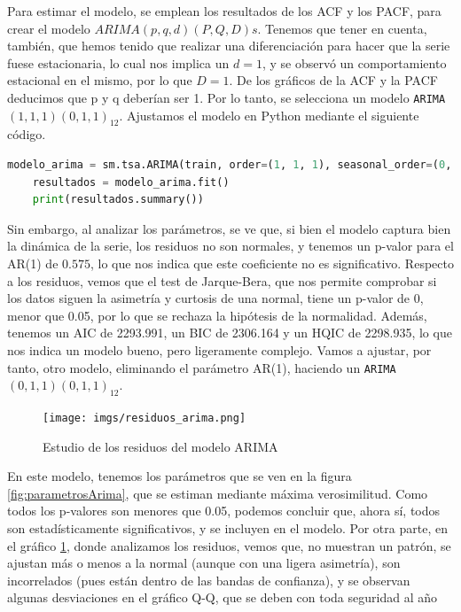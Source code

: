\documentclass[a4paper,onecolumn]{extarticle}
\begin{document}
\begin{sloppypar}
Para estimar el modelo, se emplean los resultados de los ACF y los PACF, para crear el modelo $ARIMA(p,q,d)(P,Q,D)s$. Tenemos que tener en cuenta, también, que 
hemos tenido que realizar una diferenciación para hacer que la serie fuese estacionaria, lo cual nos implica un $d=1$, y se observó un comportamiento estacional 
en el mismo, por lo que $D=1$. De los gráficos de la ACF y la PACF deducimos que p y q deberían ser 1. Por lo tanto, se selecciona un modelo 
\texttt{ARIMA$(1,1,1)(0,1,1)_{12}$}. Ajustamos el modelo en Python mediante el siguiente código. 
\begin{lstlisting}[language=Python]
    modelo_arima = sm.tsa.ARIMA(train, order=(1, 1, 1), seasonal_order=(0, 1, 1, 12))
    resultados = modelo_arima.fit()
    print(resultados.summary())
\end{lstlisting}
Sin embargo, al analizar los parámetros, se ve que, si bien el modelo captura bien la dinámica de la serie, los residuos no son normales, y tenemos un p-valor 
para el AR(1) de $0.575$, lo que nos indica que este coeficiente no es significativo. Respecto a los residuos, vemos que el test de Jarque-Bera, que nos permite 
comprobar si los datos siguen la asimetría y curtosis de una normal, tiene un p-valor de 0, menor que 0.05, por lo que se rechaza la hipótesis de la normalidad. 
Además, tenemos un AIC de 2293.991, un BIC de 2306.164 y un HQIC de 2298.935, lo que nos indica un modelo bueno, pero ligeramente complejo. Vamos a ajustar, por 
tanto, otro modelo, eliminando el parámetro AR(1), haciendo un \texttt{ARIMA$(0,1,1)(0,1,1)_{12}$}.
\begin{center}
    \begin{figure}[h!]
        \centering
        \texttt{[image: imgs/residuos\_arima.png]}
        \caption{Estudio de los residuos del modelo ARIMA} \label{fig:residuos_arima}
    \end{figure}
\end{center}
En este modelo, tenemos los parámetros que se ven en la figura \ref{fig:parametrosArima}, que se estiman mediante máxima verosimilitud. Como todos los p-valores 
son menores que 0.05, podemos concluir que, ahora sí, todos son estadísticamente significativos, y se incluyen en el modelo. Por otra parte, en el gráfico 
\ref{fig:residuos_arima}, donde analizamos los residuos, vemos que, no muestran un patrón, se ajustan más o menos a la normal (aunque con una ligera asimetría), 
son incorrelados (pues están dentro de las bandas de confianza), y se observan algunas desviaciones en el gráfico Q-Q, que se deben con toda seguridad al año 

\end{sloppypar}
\end{document}
